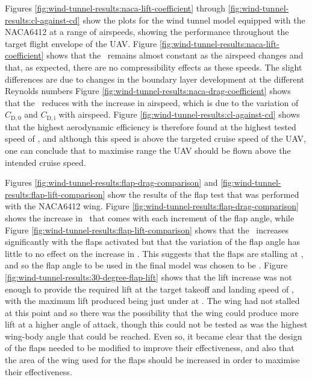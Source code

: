 \documentclass[../../main.tex]{subfiles}
\begin{document}
Figures \ref{fig:wind-tunnel-results:naca-lift-coefficient} through \ref{fig:wind-tunnel-results:cl-against-cd} show the plots for the wind tunnel model equipped with the NACA6412 at a range of airspeeds, showing the performance throughout the target flight envelope of the UAV.
Figure \ref{fig:wind-tunnel-results:naca-lift-coefficient} shows that the \cl\, remains almost constant as the airspeed changes and that, as expected, there are no compressibility effects as these speeds. The slight differences are due to changes in the boundary layer development at the different Reynolds numbers
Figure \ref{fig:wind-tunnel-results:naca-drag-coefficient} shows that the \cd\, reduces with the increase in airspeed, which is due to the variation of $C_\mathrm{D,0}$ and $C_\mathrm{D,i}$ with airspeed.
Figure \ref{fig:wind-tunnel-results:cl-against-cd} shows that the highest aerodynamic efficiency is therefore found at the highest tested speed of , and although this speed is above the targeted cruise speed of the UAV, one can conclude that to maximise range the UAV should be flown above the intended cruise speed. 

Figures \ref{fig:wind-tunnel-results:flap-drag-comparison} and \ref{fig:wind-tunnel-results:flap-lift-comparison} show the results of the flap test that was performed with the NACA6412 wing.
Figure \ref{fig:wind-tunnel-results:flap-drag-comparison} shows the increase in \cd\, that comes with each increment of the flap angle, while Figure \ref{fig:wind-tunnel-results:flap-lift-comparison} shows that the \cl\, increases significantly with the flaps activated but that the variation of the flap angle has little to no effect on the increase in \cl.
This suggests that the flaps are stalling at , and so the flap angle to be used in the final model was chosen to be .
Figure \ref{fig:wind-tunnel-results:30-degree-flap-lift} shows that the lift increase was not enough to provide the required lift at the target takeoff and landing speed of , with the maximum lift produced being just under  at .
The wing had not stalled at this point and so there was the possibility that the wing could produce more lift at a higher angle of attack, though this could not be tested as  was the highest wing-body angle that could be reached.
Even so, it became clear that the design of the flaps needed to be modified to improve their effectiveness, and also that the area of the wing used for the flaps should be increased in order to maximise their effectiveness. 
\end{document}
